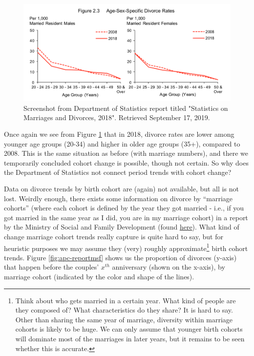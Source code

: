 \documentclass[
  openany]{book}
\begin{document}
\begin{figure}

{\centering \includegraphics[width=0.8\linewidth]{images/apc/report_fig3} 

}

\caption{Screenshot from Department of Statistics report titled "Statistics on Marriages and Divorces,  2018". Retrieved September 17, 2019.}\label{fig:apc-reportsingstat2nd}
\end{figure}

Once again we see from Figure \ref{fig:apc-reportsingstat2nd} that in 2018, divorce rates are lower among younger age groups (20-34) and higher in older age groups (35+), compared to 2008. This is the same situation as before (with marriage numbers), and there we temporarily concluded cohort change is possible, though not certain. So why does the Department of Statistics not connect period trends with cohort change?

Data on divorce trends by birth cohort are (again) not available, but all is not lost. Weirdly enough, there exists some information on divorce by ``marriage cohorts'' (where each cohort is defined by the year they got married - i.e., if you got married in the same year as I did, you are in my marriage cohort) in a report by the Ministry of Social and Family Development (found \href{https://www.msf.gov.sg/research-and-data/Research-and-Data-Series/Pages/default.aspx}{here}). What kind of change marriage cohort trends really capture is quite hard to say, but for heuristic purposes we may assume they (very) roughly approximate\footnote{Think about who gets married in a certain year. What kind of people are they composed of? What characteristics do they share? It is hard to say. Other than sharing the same year of marriage, diversity within marriage cohorts is likely to be huge. We can only assume that younger birth cohorts will dominate most of the marriages in later years, but it remains to be seen whether this is accurate.} birth cohort trends. Figure \ref{fig:apc-reportmsf} shows us the proportion of divorces (y-axis) that happen before the couples' \(x^{th}\) anniversary (shown on the x-axis), by marriage cohort (indicated by the color and shape of the lines).
\end{document}
